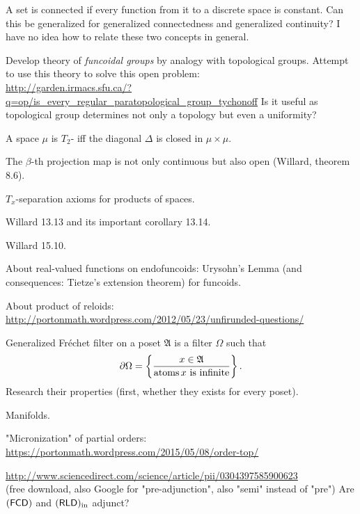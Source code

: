 \documentclass{amsart}
\begin{document}
A set is connected if every function from it to a discrete space is constant. Can this be generalized for generalized connectedness and generalized continuity? I have no idea how to relate these two concepts in general.

Develop theory of \emph{funcoidal groups} by analogy with topological groups.
Attempt to use this theory to solve this open problem:\\
\url{http://garden.irmacs.sfu.ca/?q=op/is_every_regular_paratopological_group_tychonoff}
Is it useful as topological group determines not only a topology but even a uniformity?

A space $\mu$ is $T_2$- iff the diagonal $\Delta$ is closed in $\mu\times\mu$.

The $\beta$-th projection map is not only continuous but also open (Willard, theorem 8.6).

$T_x$-separation axioms for products of spaces.

Willard 13.13 and its important corollary 13.14.

Willard 15.10.

About real-valued functions on endofuncoids: Urysohn's Lemma (and consequences: Tietze's extension theorem) for funcoids.

About product of reloids:\\
\url{http://portonmath.wordpress.com/2012/05/23/unfirunded-questions/}

Generalized Fr\'echet filter on a poset $\mathfrak{A}$ is a filter $\Omega$ such that
\[ \partial\Omega = \left\{ \frac{x\in\mathfrak{A}}{\operatorname{atoms} x\text{ is infinite}}\right\}. \]
Research their properties (first, whether they exists for every poset).

Manifolds.

"Micronization" of partial orders:\\
\url{https://portonmath.wordpress.com/2015/05/08/order-top/}

\url{http://www.sciencedirect.com/science/article/pii/0304397585900623}\\
(free download, also Google for "pre-adjunction", also "semi" instead of "pre") Are $(\mathsf{FCD})$ and $(\mathsf{RLD})_{\mathrm{in}}$ adjunct?
\end{document}
